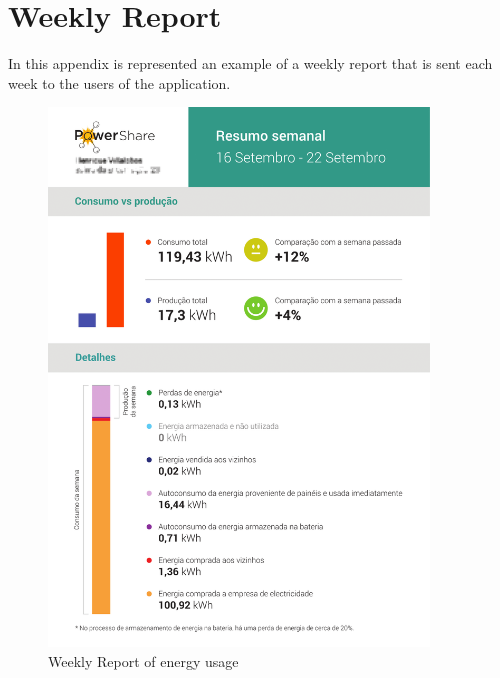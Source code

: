 \chapter{Weekly Report}
\label{chapter:appendixC}
In this appendix is represented an example of a weekly report that is sent each week to the users of the application. 

\begin{figure}[h]
\centering
\includegraphics[width=0.9\textwidth]{./Images/weeklyreport}
\caption{Weekly Report of energy usage}
\label{fig:weeklyreport}
\end{figure}